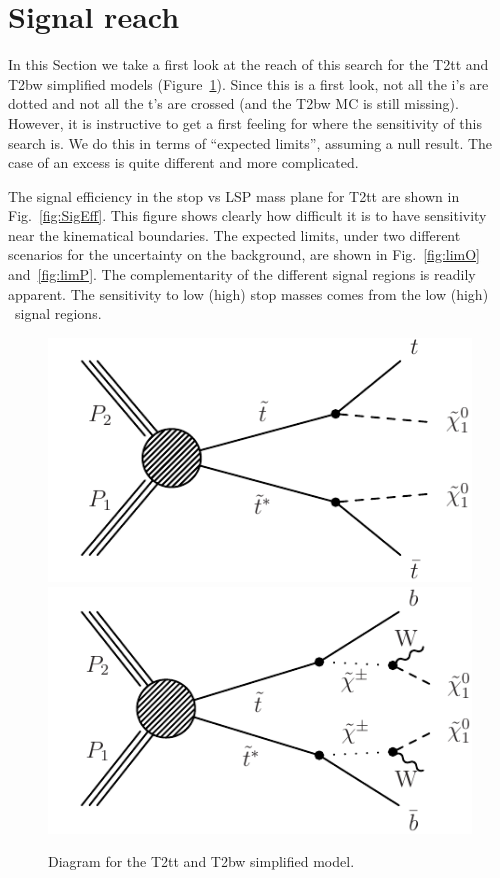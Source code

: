 \section{Signal reach}
\label{sec:signal}

In this Section we take a first look at the 
reach of this search for the T2tt and T2bw simplified models 
(Figure~\ref{fig:SigDiagram}).  Since this is a first look, not 
all the i's are dotted and not all the t's are crossed  (and the 
T2bw MC is still missing).  However, it is instructive to 
get a first feeling for where the sensitivity of this search is.
We do this in terms of ``expected limits'', assuming a null result.
The case of an excess is quite different and more complicated.

The signal efficiency in the stop vs LSP mass plane for T2tt are shown 
in Fig.~\ref{fig:SigEff}.  This figure shows clearly how difficult it
is
to have sensitivity near the kinematical boundaries.
The expected limits, under two different 
scenarios for the uncertainty on the background, are shown in
Fig.~\ref{fig:limO} and~\ref{fig:limP}.  The complementarity of the 
different signal regions is readily apparent.  
The sensitivity to low (high) stop masses comes from the 
low (high) \met\ signal regions.


\begin{figure}[hbt]
  \begin{center}
        \includegraphics[width=0.5\linewidth]{plots/stopPlot/T2tt.pdf}%
        \includegraphics[width=0.5\linewidth]{plots/stopPlot/T2bw.pdf}%
	\caption{Diagram for the T2tt and T2bw simplified model.}
	\label{fig:SigDiagram}
      \end{center}
\end{figure}



